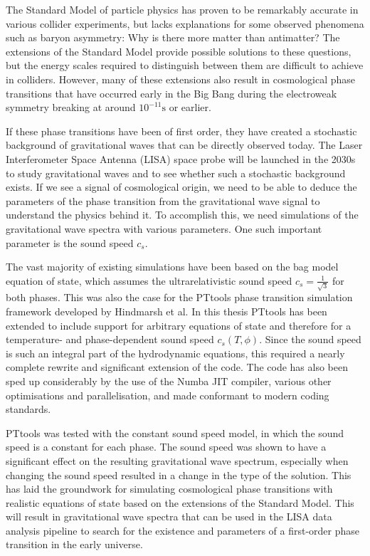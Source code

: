 The Standard Model of particle physics has proven to be remarkably accurate in various collider experiments,
but lacks explanations for some observed phenomena such as baryon asymmetry: Why is there more matter than antimatter?
The extensions of the Standard Model provide possible solutions to these questions,
but the energy scales required to distinguish between them are difficult to achieve in colliders.
However, many of these extensions also result in cosmological phase transitions that have occurred early in the Big Bang during the electroweak symmetry breaking at around $10^{-11} \text{s}$ or earlier.

If these phase transitions have been of first order,
they have created a stochastic background of gravitational waves that can be directly observed today.
The Laser Interferometer Space Antenna (LISA) space probe will be launched in the 2030s to study gravitational waves and
to see whether such a stochastic background exists.
If we see a signal of cosmological origin,
we need to be able to deduce the parameters of the phase transition from the gravitational wave signal to understand the physics behind it.
To accomplish this, we need simulations of the gravitational wave spectra with various parameters.
One such important parameter is the sound speed $c_s$.

The vast majority of existing simulations have been based on the bag model equation of state,
which assumes the ultrarelativistic sound speed $c_s =\frac{1}{\sqrt{3}}$ for both phases.
This was also the case for the PTtools phase transition simulation framework developed by Hindmarsh et al.
In this thesis PTtools has been extended to include support for arbitrary equations of state and therefore for a temperature- and phase-dependent sound speed $c_s(T,\phi)$.
Since the sound speed is such an integral part of the hydrodynamic equations,
this required a nearly complete rewrite and significant extension of the code.
The code has also been sped up considerably by the use of the Numba JIT compiler, various other optimisations and parallelisation,
and made conformant to modern coding standards.

PTtools was tested with the constant sound speed model, in which the sound speed is a constant for each phase.
The sound speed was shown to have a significant effect on the resulting gravitational wave spectrum,
especially when changing the sound speed resulted in a change in the type of the solution.
This has laid the groundwork for simulating cosmological phase transitions with realistic equations of state based on the extensions of the Standard Model.
This will result in gravitational wave spectra that can be used in the LISA data analysis pipeline to search for the existence and parameters of a first-order phase transition in the early universe.
